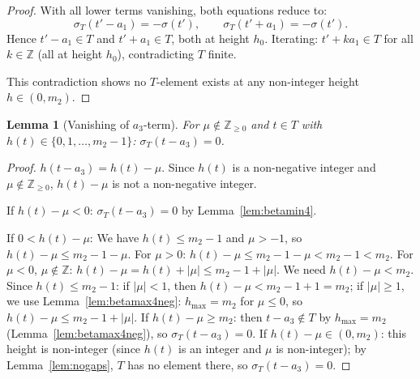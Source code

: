 \documentclass{article}
\newtheorem{lemma}{Lemma}
\begin{document}
\begin{proof}
With all lower terms vanishing, both equations reduce to:
\[
  \sigma_T(t'-a_1)=-\sigma(t'),\qquad \sigma_T(t'+a_1)=-\sigma(t').
\]
Hence $t'-a_1\in T$ and $t'+a_1\in T$, both at height $h_0$.
Iterating: $t'+ka_1\in T$ for all $k\in\mathbb{Z}$ (all at height $h_0$), contradicting $T$ finite.

This contradiction shows no $T$-element exists at any non-integer height $h\in(0,m_2)$.
\end{proof}

\begin{lemma}[Vanishing of $a_3$-term]\label{lem:a3vanish}
For $\mu\notin\mathbb{Z}_{\ge 0}$ and $t\in T$ with $h(t)\in\{0,1,\dots,m_2-1\}$\textup{:}
$\sigma_T(t-a_3)=0$.
\end{lemma}
\begin{proof}
$h(t-a_3)=h(t)-\mu$.  Since $h(t)$ is a non-negative integer and $\mu\notin\mathbb{Z}_{\ge 0}$,
$h(t)-\mu$ is not a non-negative integer.

If $h(t)-\mu<0$: $\sigma_T(t-a_3)=0$ by Lemma~\ref{lem:betamin4}.

If $0<h(t)-\mu$: We have $h(t)\le m_2-1$ and $\mu>-1$,
so $h(t)-\mu\le m_2-1-\mu$.
For $\mu>0$: $h(t)-\mu\le m_2-1-\mu<m_2-1<m_2$.
For $\mu<0$, $\mu\notin\mathbb{Z}$: $h(t)-\mu=h(t)+|\mu|\le m_2-1+|\mu|$.
We need $h(t)-\mu<m_2$.
Since $h(t)\le m_2-1$: if $|\mu|<1$, then $h(t)-\mu<m_2-1+1=m_2$; if $|\mu|\ge 1$,
we use Lemma~\ref{lem:betamax4neg}: $h_{\max}=m_2$ for $\mu\le 0$,
so $h(t)-\mu\le m_2-1+|\mu|$.  If $h(t)-\mu\ge m_2$: then $t-a_3\notin T$
by $h_{\max}=m_2$ (Lemma~\ref{lem:betamax4neg}), so $\sigma_T(t-a_3)=0$.
If $h(t)-\mu\in(0,m_2)$: this height is non-integer (since $h(t)$ is an integer and $\mu$ is
non-integer); by Lemma~\ref{lem:nogaps}, $T$ has no element there, so $\sigma_T(t-a_3)=0$.
\end{proof}
\end{document}
